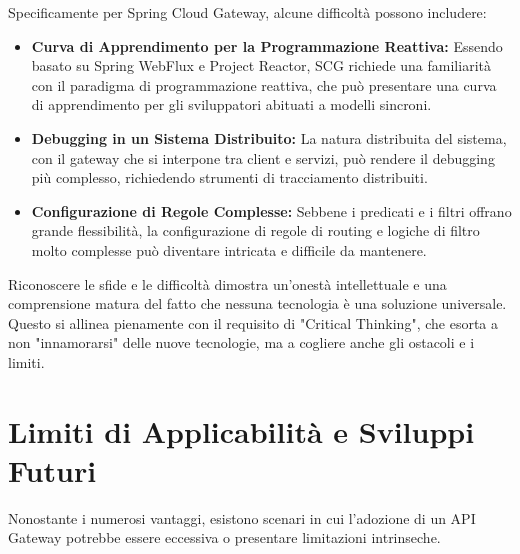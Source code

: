 Specificamente per Spring Cloud Gateway, alcune difficoltà possono includere:

\begin{itemize}
    \item \textbf{Curva di Apprendimento per la Programmazione Reattiva:} Essendo basato su Spring WebFlux e Project Reactor, SCG richiede una familiarità con il paradigma di programmazione reattiva, che può presentare una curva di apprendimento per gli sviluppatori abituati a modelli sincroni.
    \item \textbf{Debugging in un Sistema Distribuito:} La natura distribuita del sistema, con il gateway che si interpone tra client e servizi, può rendere il debugging più complesso, richiedendo strumenti di tracciamento distribuiti.
    \item \textbf{Configurazione di Regole Complesse:} Sebbene i predicati e i filtri offrano grande flessibilità, la configurazione di regole di routing e logiche di filtro molto complesse può diventare intricata e difficile da mantenere.
\end{itemize}

Riconoscere le sfide e le difficoltà dimostra un'onestà intellettuale e una comprensione matura del fatto che nessuna tecnologia è una soluzione universale. Questo si allinea pienamente con il requisito di "Critical Thinking", che esorta a non "innamorarsi" delle nuove tecnologie, ma a cogliere anche gli ostacoli e i limiti.

\section{Limiti di Applicabilità e Sviluppi Futuri}

Nonostante i numerosi vantaggi, esistono scenari in cui l'adozione di un API Gateway potrebbe essere eccessiva o presentare limitazioni intrinseche.

